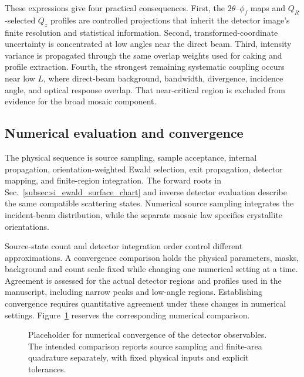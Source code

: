 These expressions give four practical consequences. First, the $2\theta$--$\phi_f$ maps and $Q_R$-selected $Q_z$ profiles are controlled projections that inherit the detector image's finite resolution and statistical information. Second, transformed-coordinate uncertainty is concentrated at low angles near the direct beam. Third, intensity variance is propagated through the same overlap weights used for caking and profile extraction. Fourth, the strongest remaining systematic coupling occurs near low $L$, where direct-beam background, bandwidth, divergence, incidence angle, and optical response overlap. That near-critical region is excluded from evidence for the broad mosaic component.

\subsection{Numerical evaluation and convergence}

The physical sequence is source sampling, sample acceptance, internal propagation, orientation-weighted Ewald selection, exit propagation, detector mapping, and finite-region integration. The forward roots in Sec.~\ref{subsec:si_ewald_surface_chart} and inverse detector evaluation describe the same compatible scattering states. Numerical source sampling integrates the incident-beam distribution, while the separate mosaic law specifies crystallite orientations.

Source-state count and detector integration order control different approximations. A convergence comparison holds the physical parameters, masks, background and count scale fixed while changing one numerical setting at a time. Agreement is assessed for the actual detector regions and profiles used in the manuscript, including narrow peaks and low-angle regions. Establishing convergence requires quantitative agreement under these changes in numerical settings. Figure~\ref{fig:si_convergence} reserves the corresponding numerical comparison.


\begin{figure}[!htbp]
  \centering
  \caption{Placeholder for numerical convergence of the detector observables. The intended comparison reports source sampling and finite-area quadrature separately, with fixed physical inputs and explicit tolerances.}
  \label{fig:si_convergence}
\end{figure}
